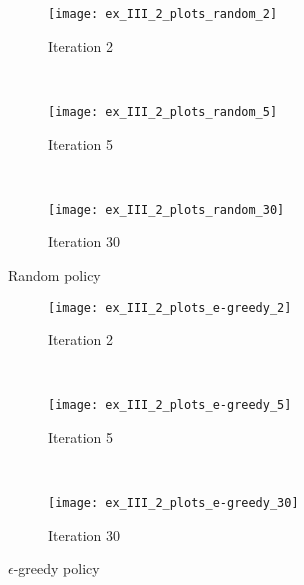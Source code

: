 \begin{multicols}{3}
	\setlength{\figsize}{.25\textwidth}
	\begin{figure}[H]
		\centering
		\begin{subfigure}{\figsize}
			\centering
			\texttt{[image: ex\_III\_2\_plots\_random\_2]}
			\caption{Iteration 2}
			\label{fig:ex_III_2_plots_random_2}
		\end{subfigure}\\
		\begin{subfigure}{\figsize}
			\centering
			\texttt{[image: ex\_III\_2\_plots\_random\_5]}
			\caption{Iteration 5}
			\label{fig:ex_III_2_plots_random_5}
		\end{subfigure}\\
		\begin{subfigure}{\figsize}
			\centering
			\texttt{[image: ex\_III\_2\_plots\_random\_30]}
			\caption{Iteration 30}
			\label{fig:ex_III_2_plots_random_30}
		\end{subfigure}
		\caption{Random policy}
		\label{fig:random}
	\end{figure}
	\columnbreak

	\begin{figure}[H]
		\centering
		\begin{subfigure}{\figsize}
			\centering
			\texttt{[image: ex\_III\_2\_plots\_e-greedy\_2]}
			\caption{Iteration 2}
			\label{fig:ex_III_2_plots_e-greedy_2}
		\end{subfigure}\\
		\begin{subfigure}{\figsize}
			\centering
			\texttt{[image: ex\_III\_2\_plots\_e-greedy\_5]}
			\caption{Iteration 5}
			\label{fig:ex_III_2_plots_e-greedy_5}
		\end{subfigure}\\
		\begin{subfigure}{\figsize}
			\centering
			\texttt{[image: ex\_III\_2\_plots\_e-greedy\_30]}
			\caption{Iteration 30}
			\label{fig:ex_III_2_plots_e-greedy_30}
		\end{subfigure}
		\caption{$\epsilon$-greedy policy}
		\label{fig:e-greedy}
	\end{figure}
	\columnbreak


\end{multicols}
